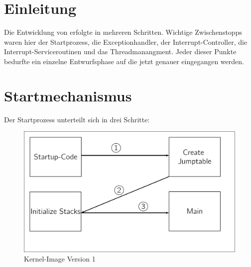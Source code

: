 \section{Einleitung}
Die Entwicklung von \mops erfolgte in mehreren Schritten. Wichtige Zwischenstopps waren hier der Startprozess, die Exceptionhandler, der Interrupt-Controller, die Interrupt-Serviceroutinen und das Threadmanangment. Jeder dieser Punkte bedurfte ein einzelne Entwurfsphase auf die jetzt genauer eingegangen werden.
\section{Startmechanismus}
\label{e1:start}
Der Startprozess unterteilt sich in drei Schritte:

	\begin{figure}[h]
		\centering
					\includegraphics[scale=0.60]{common/kernel-img.pdf}	
		\caption{Kernel-Image Version 1}
		\label{draft:kernelImage}
	\end{figure}
